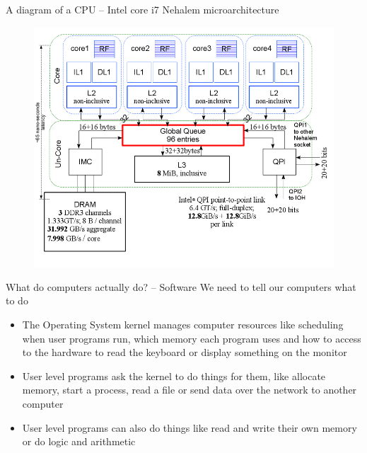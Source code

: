 \documentclass{beamer}
\begin{document}
\begin{frame}{A diagram of a CPU -- Intel core i7 Nehalem microarchitecture}
	\begin{figure}
		\includegraphics[scale=0.5]{Intel_core_i7.png}
	\end{figure}
\end{frame}

\begin{frame}{What do computers actually do? -- Software}
	We need to tell our computers what to do
	\begin{itemize}
		\item The Operating System kernel manages computer resources like scheduling when
			user programs run, which memory each program uses and how to access to the hardware to
			read the keyboard or display something on the monitor
		\item User level programs ask the kernel to do things for
			them, like allocate memory, start a process, read a file or send data over the
			network to another computer
       \item User level programs can also do things like read and write their
	   own memory or do logic and arithmetic
	\end{itemize}
\end{frame}
\end{document}
